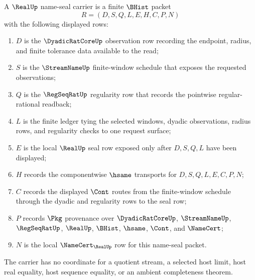 \begin{definition}
\label{def:real-name-seal-carrier}
A $\RealUp$ name-seal carrier is a finite $\BHist$ packet
$$
R=(D,S,Q,L,E,H,C,P,N)
$$
with the following displayed rows:
\begin{enumerate}
\item $D$ is the $\DyadicRatCoreUp$ observation row recording the endpoint, radius, and finite tolerance data available to the read;
\item $S$ is the $\StreamNameUp$ finite-window schedule that exposes the requested observations;
\item $Q$ is the $\RegSeqRatUp$ regularity row that records the pointwise regular-rational readback;
\item $L$ is the finite ledger tying the selected windows, dyadic observations, radius rows, and regularity checks to one request surface;
\item $E$ is the local $\RealUp$ seal row exposed only after $D,S,Q,L$ have been displayed;
\item $H$ records the componentwise $\hsame$ transports for $D,S,Q,L,E,C,P,N$;
\item $C$ records the displayed $\Cont$ routes from the finite-window schedule through the dyadic and regularity rows to the seal row;
\item $P$ records $\Pkg$ provenance over $\DyadicRatCoreUp$, $\StreamNameUp$, $\RegSeqRatUp$, $\RealUp$, $\BHist$, $\hsame$, $\Cont$, and $\NameCert$;
\item $N$ is the local $\NameCert_{\RealUp}$ row for this name-seal packet.
\end{enumerate}
The carrier has no coordinate for a quotient stream, a selected host limit, host real equality, host sequence equality, or an ambient completeness theorem.
\end{definition}

